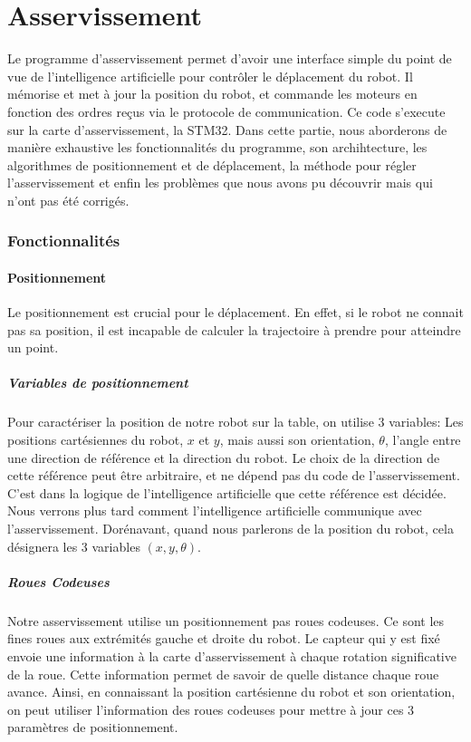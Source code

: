 \documentclass{article}
\begin{document}
	\part{Asservissement}
		Le programme d'asservissement permet d'avoir une interface simple du point de vue de l'intelligence artificielle pour contrôler le déplacement du robot. Il mémorise et met à jour la position du robot, et commande les moteurs en fonction des ordres reçus via le protocole de communication. Ce code s'execute sur la carte d'asservissement, la STM32. Dans cette partie, nous aborderons de manière exhaustive les fonctionnalités du programme, son archihtecture, les algorithmes de positionnement et de déplacement, la méthode pour régler l'asservissement et enfin les problèmes que nous avons pu découvrir mais qui n'ont pas été corrigés.

		\section{Fonctionnalités}

			\subsection{Positionnement}
				Le positionnement est crucial pour le déplacement. En effet, si le robot ne connait pas sa position, il est incapable de calculer la trajectoire à prendre pour atteindre un point. 
				
				\subsubsection{Variables de positionnement}
					Pour caractériser la position de notre robot sur la table, on utilise 3 variables: Les positions cartésiennes du robot, $x$ et $y$, mais aussi son orientation, $\theta$, l'angle entre une direction de référence et la direction du robot. Le choix de la direction de cette référence peut être arbitraire, et ne dépend pas du code de l'asservissement. C'est dans la logique de l'intelligence artificielle que cette référence est décidée. Nous verrons plus tard comment l'intelligence artificielle communique avec l'asservissement. Dorénavant, quand nous parlerons de la position du robot, cela désignera les 3 variables $(x,y,\theta)$.


				\subsubsection{Roues Codeuses}
				Notre asservissement utilise un positionnement pas roues codeuses. Ce sont les fines roues aux extrémités gauche et droite du robot. Le capteur qui y est fixé envoie une information à la carte d'asservissement à chaque rotation significative de la roue. Cette information permet de savoir de quelle distance chaque roue avance. Ainsi, en connaissant la position cartésienne du robot et son orientation, on peut utiliser l'information des roues codeuses pour mettre à jour ces 3 paramètres de positionnement.
\end{document}
